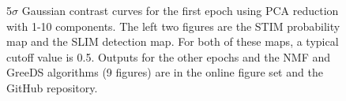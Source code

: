 

\begin{figure}[h!]
    \centering
    \caption{5$\sigma$ Gaussian contrast curves for the first epoch using PCA reduction with 1-10 components. The left two figures are the STIM probability map and the SLIM detection map. For both of these maps, a typical cutoff value is 0.5. Outputs for the other epochs and the NMF and GreeDS algorithms (9 figures) are in the online figure set and the GitHub repository.}
    \label{fig:pca-contrast-curves}
\end{figure}
